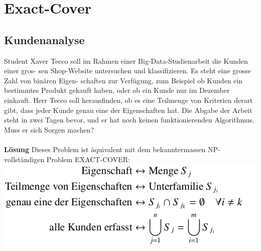 \section{Exact-Cover}
\subsection{Kundenanalyse}
Student Xaver Tecco soll im Rahmen einer Big-Data-Studienarbeit die Kunden einer gros- sen Shop-Website untersuchen und klassifizieren. Es steht eine grosse Zahl von binären Eigen- schaften zur Verfügung, zum Beispiel ob Kunden ein bestimmtes Produkt gekauft haben, oder ob ein Kunde nur im Dezember einkauft. Herr Tecco soll herausfinden, ob es eine Teilmenge von Kriterien derart gibt, dass jeder Kunde genau eine der Eigenschaften hat. Die Abgabe der Arbeit steht in zwei Tagen bevor, und er hat noch keinen funktionierenden Algorithmus. Muss er sich Sorgen machen?\\
\\
\textbf{Lösung}
Dieses Problem ist äquivalent mit dem bekanntermassen NP-vollständigen Problem EXACT-COVER:
\includegraphics[width=\columnwidth]{img/exact-cover.png}

